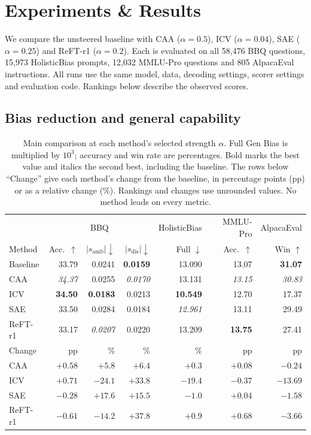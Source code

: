 \documentclass{article}
\begin{document}
\section{Experiments \& Results}
\label{sec:results}

We compare the unsteered baseline with CAA ($\alpha=0.5$), ICV ($\alpha=0.04$), SAE ($\alpha=0.25$) and ReFT-r1 ($\alpha=0.2$). Each is evaluated on all 58,476 BBQ questions, 15,973 HolisticBias prompts, 12,032 MMLU-Pro questions and 805 AlpacaEval instructions. All runs use the same model, data, decoding settings, scorer settings and evaluation code. Rankings below describe the observed scores.

\subsection{Bias reduction and general capability}

\begin{table}[ht]
  \caption{Main comparison at each method's selected strength $\alpha$. Full Gen Bias is multiplied by $10^3$; accuracy and win rate are percentages. Bold marks the best value and italics the second best, including the baseline. The rows below ``Change'' give each method's change from the baseline, in percentage points (pp) or as a relative change (\%). Rankings and changes use unrounded values. No method leads on every metric.}
  \label{tab:main-results}
  \centering\small
  \setlength{\tabcolsep}{4pt}
  \begin{tabular}{lrrrrrr}
    \toprule
    & \multicolumn{3}{c}{BBQ} & HolisticBias & MMLU-Pro & AlpacaEval \\
    \cmidrule(lr){2-4}
    Method & Acc.\ $\uparrow$ & $|s_{\text{amb}}|\downarrow$ & $|s_{\text{dis}}|\downarrow$ & Full $\downarrow$ & Acc.\ $\uparrow$ & Win $\uparrow$ \\
    \midrule
    Baseline & 33.79 & 0.0241 & \textbf{0.0159} & 13.090 & 13.07 & \textbf{31.07} \\
    CAA & \textit{34.37} & 0.0255 & \textit{0.0170} & 13.131 & \textit{13.15} & \textit{30.83} \\
    ICV & \textbf{34.50} & \textbf{0.0183} & 0.0213 & \textbf{10.549} & 12.70 & 17.37 \\
    SAE & 33.50 & 0.0284 & 0.0184 & \textit{12.961} & 13.11 & 29.49 \\
    ReFT-r1 & 33.17 & \textit{0.0207} & 0.0220 & 13.209 & \textbf{13.75} & 27.41 \\
    \midrule
    Change & pp & \% & \% & \% & pp & pp \\
    CAA & $+0.58$ & $+5.8$ & $+6.4$ & $+0.3$ & $+0.08$ & $-0.24$ \\
    ICV & $+0.71$ & $-24.1$ & $+33.8$ & $-19.4$ & $-0.37$ & $-13.69$ \\
    SAE & $-0.28$ & $+17.6$ & $+15.5$ & $-1.0$ & $+0.04$ & $-1.58$ \\
    ReFT-r1 & $-0.61$ & $-14.2$ & $+37.8$ & $+0.9$ & $+0.68$ & $-3.66$ \\
    \bottomrule
  \end{tabular}
\end{table}
\end{document}
